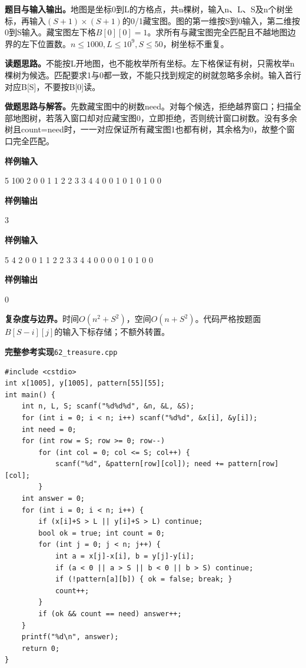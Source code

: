 \documentclass[UTF8,11pt,a4paper,fontset=none]{ctexart}
\begin{document}
\noindent\textbf{题目与输入输出。}地图是坐标0到L的方格点，共n棵树，输入n、L、S及n个树坐标，再输入$(S+1)\times(S+1)$的0/1藏宝图。图的第一维按S到0输入，第二维按0到S输入。藏宝图左下格$B[0][0]=1$。求所有与藏宝图完全匹配且不越地图边界的左下位置数。$n\le1000,L\le10^9,S\le50$，树坐标不重复。

\noindent\textbf{读题思路。}不能按L开地图，也不能枚举所有坐标。左下格保证有树，只需枚举n棵树为候选。匹配要求1与0都一致，不能只找到规定的树就忽略多余树。输入首行对应B[S]，不要按B[0]读。

\noindent\textbf{做题思路与解答。}先数藏宝图中的树数need。对每个候选，拒绝越界窗口；扫描全部地图树，若落入窗口却对应藏宝图0，立即拒绝，否则统计窗口树数。没有多余树且count=need时，一一对应保证所有藏宝图1也都有树，其余格为0，故整个窗口完全匹配。
\begin{tcolorbox}[samplebox,title={输入输出样例}]
\textbf{样例输入}
\begin{Sample}
5 100 2
0 0
1 1
2 2
3 3
4 4
0 0 1
0 1 0
1 0 0
\end{Sample}
\tcblower
\textbf{样例输出}
\begin{Sample}
3
\end{Sample}
\end{tcolorbox}
\begin{tcolorbox}[samplebox,title={输入输出样例}]
\textbf{样例输入}
\begin{Sample}
5 4 2
0 0
1 1
2 2
3 3
4 4
0 0 0
0 1 0
1 0 0
\end{Sample}
\tcblower
\textbf{样例输出}
\begin{Sample}
0
\end{Sample}
\end{tcolorbox}

\noindent\textbf{复杂度与边界。}时间$O(n^2+S^2)$，空间$O(n+S^2)$。代码严格按题面$B[S-i][j]$的输入下标存储；不额外转置。
\par\noindent\begin{minipage}{\linewidth}
\textbf{完整参考实现}\quad\texttt{62\_treasure.cpp}
\begin{lstlisting}
#include <cstdio>
int x[1005], y[1005], pattern[55][55];
int main() {
    int n, L, S; scanf("%d%d%d", &n, &L, &S);
    for (int i = 0; i < n; i++) scanf("%d%d", &x[i], &y[i]);
    int need = 0;
    for (int row = S; row >= 0; row--)
        for (int col = 0; col <= S; col++) {
            scanf("%d", &pattern[row][col]); need += pattern[row][col];
        }
    int answer = 0;
    for (int i = 0; i < n; i++) {
        if (x[i]+S > L || y[i]+S > L) continue;
        bool ok = true; int count = 0;
        for (int j = 0; j < n; j++) {
            int a = x[j]-x[i], b = y[j]-y[i];
            if (a < 0 || a > S || b < 0 || b > S) continue;
            if (!pattern[a][b]) { ok = false; break; }
            count++;
        }
        if (ok && count == need) answer++;
    }
    printf("%d\n", answer);
    return 0;
}
\end{lstlisting}
\end{minipage}\par
\end{document}

